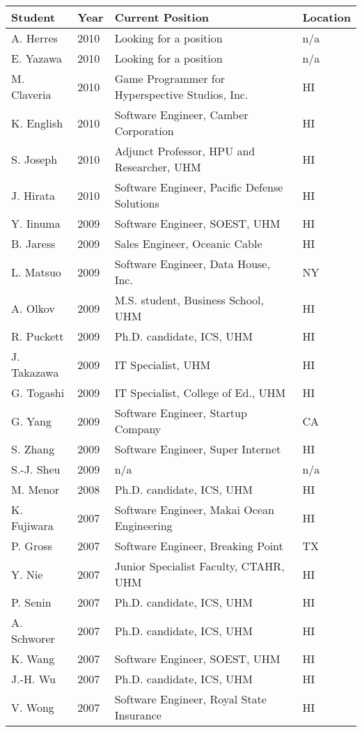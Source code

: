 \documentclass[12pt]{article}
\begin{document}
\begin{tabular}{|l|l|l|l|}
\hline
Student & Year & Current Position & Location \\
\hline
A. Herres   & 2010 & Looking for a position & n/a\\
E. Yazawa   & 2010 & Looking for a position & n/a\\
M. Claveria & 2010 & Game Programmer for Hyperspective Studios, Inc. & HI\\
K. English  & 2010 & Software Engineer, Camber Corporation & HI\\
S. Joseph   & 2010 & Adjunct Professor, HPU and Researcher, UHM & HI\\
J. Hirata   & 2010 & Software Engineer, Pacific Defense Solutions & HI\\
\hline
Y. Iinuma   & 2009 & Software Engineer, SOEST, UHM & HI\\
B. Jaress   & 2009 & Sales Engineer, Oceanic Cable & HI\\
L. Matsuo   & 2009 & Software Engineer, Data House, Inc. & NY\\
A. Olkov    & 2009 & M.S. student, Business School, UHM & HI\\
R. Puckett  & 2009 & Ph.D. candidate, ICS, UHM & HI\\
J. Takazawa & 2009 & IT Specialist, UHM & HI\\
G. Togashi  & 2009 & IT Specialist, College of Ed., UHM & HI\\
G. Yang     & 2009 & Software Engineer, Startup Company & CA\\
S. Zhang    & 2009 & Software Engineer, Super Internet & HI\\
S.-J. Sheu  & 2009 & n/a & n/a\\
\hline
M. Menor    & 2008 & Ph.D. candidate, ICS, UHM & HI\\
\hline
K. Fujiwara & 2007 & Software Engineer, Makai Ocean Engineering & HI\\
P. Gross    & 2007 & Software Engineer, Breaking Point & TX\\
Y. Nie      & 2007 & Junior Specialist Faculty, CTAHR, UHM & HI\\
P. Senin    & 2007 & Ph.D. candidate, ICS, UHM & HI\\
A. Schworer & 2007 & Ph.D. candidate, ICS, UHM & HI\\
K. Wang     & 2007 & Software Engineer, SOEST, UHM & HI\\
J.-H. Wu    & 2007 & Ph.D. candidate, ICS, UHM & HI\\
V. Wong     & 2007 & Software Engineer, Royal State Insurance & HI\\

\end{tabular}
\end{document}
